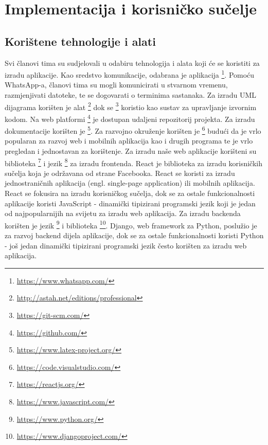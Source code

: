 \chapter{Implementacija i korisničko sučelje}
		
		
		\section{Korištene tehnologije i alati}
		
			
			Svi članovi tima su sudjelovali u odabiru tehnologija i alata koji će se koristiti za izradu aplikacije. Kao sredstvo komunikacije, odabrana je aplikacija 
			\footnote{\url{https://www.whatsapp.com/}}. Pomoću WhatsApp-a, članovi tima su mogli komunicirati u stvarnom vremenu, razmjenjivati datoteke,
			te se dogovarati o terminima sastanaka. Za izradu UML dijagrama korišten je alat \footnote{\url{http://astah.net/editions/professional}}
			dok se \footnote{\url{https://git-scm.com/}} koristio kao sustav za upravljanje izvornim kodom. Na web platformi \footnote{\url{https://github.com/}} je dostupan udaljeni repozitorij projekta.
			Za izradu dokumentacije korišten je \footnote{\url{https://www.latex-project.org/}}.
			Za razvojno okruženje korišten je \footnote{\url{https://code.visualstudio.com/}} budući da je vrlo popularan za razvoj web i mobilnih aplikacija kao i drugih programa te je vrlo pregledan i jednostavan za korištenje.
			Za izradu naše web aplikacije korišteni su biblioteka \footnote{\url{https://reactjs.org/}} i jezik \footnote{\url{https://www.javascript.com/}} za izradu frontenda.
			React je biblioteka za izradu korisničkih sučelja koja je održavana od strane Facebooka. 
			React se koristi za izradu jednostraničnih aplikacija (engl. single-page application) ili mobilnih aplikacija.
			React se fokusira na izradu korisničkog sučelja, dok se za ostale funkcionalnosti aplikacije koristi JavaScript - dinamički tipizirani programski jezik koji je jedan od najpopularnijih na svijetu za izradu web aplikacija.
			Za izradu backenda korišten je jezik \footnote{\url{https://www.python.org/}} i biblioteka \footnote{\url{https://www.djangoproject.com/}}.
			Django, web framework za Python, poslužio je za razvoj backend dijela aplikacije, dok se za ostale funkcionalnosti koristi Python - još jedan dinamički tipizirani programski jezik često korišten za izradu web aplikacija.

